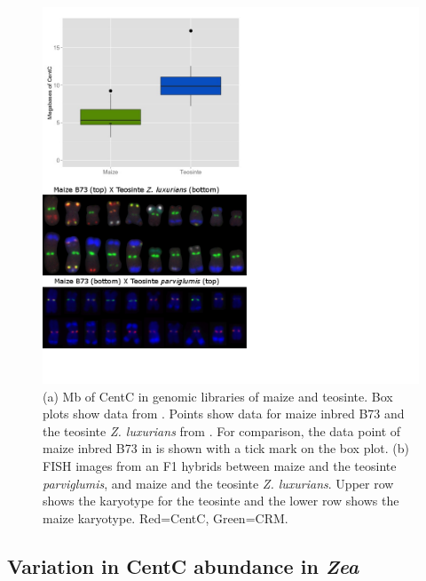 \begin{figure}
\includegraphics[width=1\textwidth]{Figure3_CentC_Abundance.png}
\caption{(a) Mb of CentC in genomic libraries of maize and teosinte.  Box plots show data from \citet{Chia2012}.  Points show data for maize inbred B73 and the teosinte \emph{Z. luxurians} from \citet{Tenaillon2011}.  For comparison, the data point of maize inbred B73 in \citet{Chia2012} is shown with a tick mark on the box plot. (b) FISH images from an F1 hybrids between maize and the teosinte \emph{parviglumis}, and maize and the teosinte \emph{Z. luxurians}.  Upper row shows the karyotype for the teosinte and the lower row shows the maize karyotype.  Red=CentC, Green=CRM. 
}
\label{abundance}    
\end{figure}

\subsection*{Variation in CentC abundance in \emph{Zea}}


